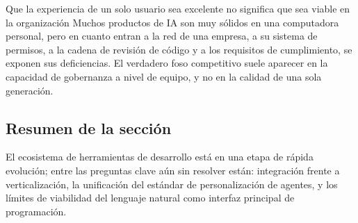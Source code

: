 \begin{warningbox}{Que la experiencia de un solo usuario sea excelente no significa que sea viable en la organización}
Muchos productos de IA son muy sólidos en una computadora personal, pero en cuanto entran a la red de una empresa, a su sistema de permisos, a la cadena de revisión de código y a los requisitos de cumplimiento, se exponen sus deficiencias. El verdadero foso competitivo suele aparecer en la capacidad de gobernanza a nivel de equipo, y no en la calidad de una sola generación.
\end{warningbox}

\subsection{Resumen de la sección}

El ecosistema de herramientas de desarrollo está en una etapa de rápida evolución; entre las preguntas clave aún sin resolver están: integración frente a verticalización, la unificación del estándar de personalización de agentes, y los límites de viabilidad del lenguaje natural como interfaz principal de programación.
